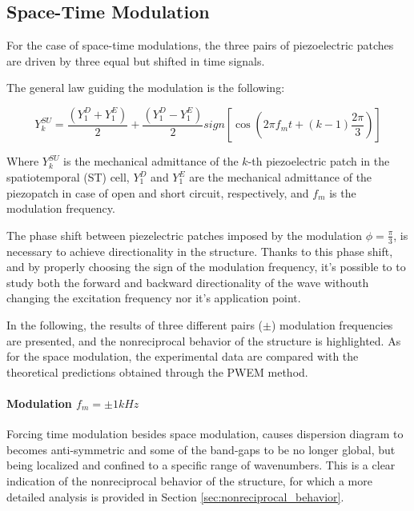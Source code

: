 \subsection{Space-Time Modulation}
\label{subsec:space_time_modulation}

For the case of space-time modulations, the three pairs of piezoelectric patches are driven by three equal but shifted in time signals.

The general law guiding the modulation is the following:

\begin{equation}
    Y_k^{SU} = \frac{(Y_1^D + Y_1^E)}{2} + \frac{(Y_1^D - Y_1^E)}{2} sign \left[ \cos \left( 2 \pi f_m t + (k-1) \frac{2\pi}{3} \right) \right]
\end{equation}

Where $Y_k^{SU}$ is the mechanical admittance of the $k$-th piezoelectric patch in the spatiotemporal (ST) cell, $Y_1^D$ and $Y_1^E$ are the mechanical admittance of the piezopatch in case of open and short circuit, respectively, and $f_m$ is the modulation frequency.

The phase shift between piezelectric patches imposed by the modulation $\phi=\frac{\pi}{3}$, is necessary to achieve directionality in the structure.
Thanks to this phase shift, and by properly choosing the sign of the modulation frequency, it's possible to to study both the forward and backward directionality of the wave withouth changing the excitation frequency nor it's application point.

In the following, the results of three different pairs ($\pm$) modulation frequencies are presented, and the nonreciprocal behavior of the structure is highlighted.
As for the space modulation, the experimental data are compared with the theoretical predictions obtained through the PWEM method.


\paragraph{Modulation $f_m = \pm 1 kHz$}

Forcing time modulation besides space modulation, causes dispersion diagram to becomes anti-symmetric and some of the band-gaps to be no longer global, but being localized and confined to a specific range of wavenumbers.
This is a clear indication of the nonreciprocal behavior of the structure, for which a more detailed analysis is provided in Section \ref{sec:nonreciprocal_behavior}.

